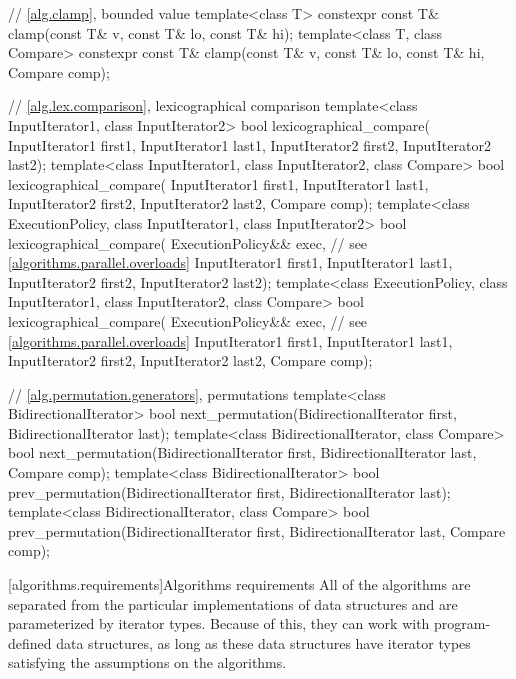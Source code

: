 \begin{codeblock}
{  // \ref{alg.clamp}, bounded value
  template<class T>
    constexpr const T& clamp(const T& v, const T& lo, const T& hi);
  template<class T, class Compare>
    constexpr const T& clamp(const T& v, const T& lo, const T& hi, Compare comp);

  // \ref{alg.lex.comparison}, lexicographical comparison
  template<class InputIterator1, class InputIterator2>
    bool lexicographical_compare(
      InputIterator1 first1, InputIterator1 last1,
      InputIterator2 first2, InputIterator2 last2);
  template<class InputIterator1, class InputIterator2, class Compare>
    bool lexicographical_compare(
      InputIterator1 first1, InputIterator1 last1,
      InputIterator2 first2, InputIterator2 last2,
      Compare comp);
  template<class ExecutionPolicy, class InputIterator1, class InputIterator2>
    bool lexicographical_compare(
      ExecutionPolicy&& exec, // see \ref{algorithms.parallel.overloads}
      InputIterator1 first1, InputIterator1 last1,
      InputIterator2 first2, InputIterator2 last2);
  template<class ExecutionPolicy, class InputIterator1, class InputIterator2, class Compare>
    bool lexicographical_compare(
      ExecutionPolicy&& exec, // see \ref{algorithms.parallel.overloads}
      InputIterator1 first1, InputIterator1 last1,
      InputIterator2 first2, InputIterator2 last2,
      Compare comp);

  // \ref{alg.permutation.generators}, permutations
  template<class BidirectionalIterator>
    bool next_permutation(BidirectionalIterator first,
                          BidirectionalIterator last);
  template<class BidirectionalIterator, class Compare>
    bool next_permutation(BidirectionalIterator first,
                          BidirectionalIterator last, Compare comp);
  template<class BidirectionalIterator>
    bool prev_permutation(BidirectionalIterator first,
                          BidirectionalIterator last);
  template<class BidirectionalIterator, class Compare>
    bool prev_permutation(BidirectionalIterator first,
                          BidirectionalIterator last, Compare comp);
}
\end{codeblock}

[algorithms.requirements]{Algorithms requirements}
\pnum
All of the algorithms are separated from the particular implementations of data structures and are
parameterized by iterator types.
Because of this, they can work with program-defined data structures, as long
as these data structures have iterator types satisfying the assumptions on the algorithms.

